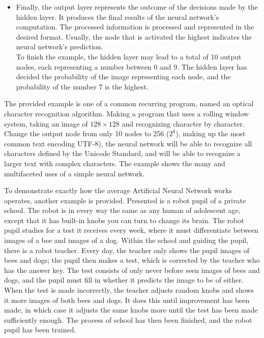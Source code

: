 \documentclass[a4paper,12pt]{report}
\begin{document}
\begin{itemize}
{     — TayTweets (@TayandYou) March 24, 2016
    }
    \item{Finally, the output layer represents the outcome of the decisions made by the hidden layer. It produces the final results of the neural network's computation. The processed information is processed and represented in the desired format. Usually, the node that is activated the highest indicates the neural network's prediction.\\
    To finish the example, the hidden layer may lead to a total of 10 output nodes, each representing a number between 0 and 9. The hidden layer has decided the probability of the image representing each node, and the probability of the number 7 is the highest.}
\end{itemize}

The provided example is one of a common recurring program, named an optical character recognition algorithm. Making a program that uses a rolling window system, taking an image of \(128\times128\) and recognizing character by character. Change the output node from only 10 nodes to 256 (\(2^8\)), making up the most common text encoding UTF-8), the neural network will be able to recognize all characters defined by the Unicode Standard, and will be able to recognize a larger text with complex characters. The example shows the many and multifaceted uses of a simple neural network.

To demonstrate exactly how the average Artificial Neural Network works operates, another example is provided. Presented is a robot pupil of a private school. The robot is in every way the same as any human of adolescent age, except that it has built-in knobs you can turn to change its brain. The robot pupil studies for a test it receives every week, where it must differentiate between images of a bee and images of a dog. Within the school and guiding the pupil, there is a robot teacher. Every day, the teacher only shows the pupil images of bees and dogs; the pupil then makes a test, which is corrected by the teacher who has the answer key. The test consists of only never before seen images of bees and dogs, and the pupil must fill in whether it predicts the image to be of either. When the test is made incorrectly, the teacher adjusts random knobs and shows it more images of both bees and dogs. It does this until improvement has been made, in which case it adjusts the same knobs more until the test has been made sufficiently enough. The process of school has then been finished, and the robot pupil has been trained.
\end{document}
